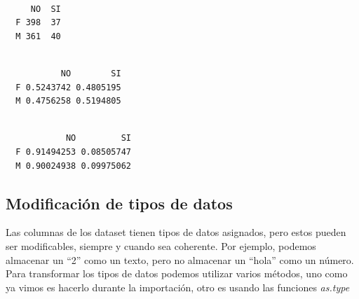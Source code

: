 \documentclass[
  letterpaper,
  DIV=11,
  numbers=noendperiod]{scrreprt}
\newenvironment{Shaded}{\begin{snugshade}}{\end{snugshade}}
\newcommand{\AttributeTok}[1]{\textcolor[rgb]{0.40,0.45,0.13}{#1}}
\newcommand{\DecValTok}[1]{\textcolor[rgb]{0.68,0.00,0.00}{#1}}
\newcommand{\FunctionTok}[1]{\textcolor[rgb]{0.28,0.35,0.67}{#1}}
\newcommand{\NormalTok}[1]{\textcolor[rgb]{0.00,0.23,0.31}{#1}}
\newcommand{\SpecialCharTok}[1]{\textcolor[rgb]{0.37,0.37,0.37}{#1}}
\begin{document}
\begin{verbatim}
   
     NO  SI
  F 398  37
  M 361  40
\end{verbatim}

\begin{Shaded}
\end{Shaded}

\begin{verbatim}
   
           NO        SI
  F 0.5243742 0.4805195
  M 0.4756258 0.5194805
\end{verbatim}

\begin{Shaded}
\end{Shaded}

\begin{verbatim}
   
            NO         SI
  F 0.91494253 0.08505747
  M 0.90024938 0.09975062
\end{verbatim}

\hypertarget{modificaciuxf3n-de-tipos-de-datos}{%
\subsection{Modificación de tipos de
datos}\label{modificaciuxf3n-de-tipos-de-datos}}

Las columnas de los dataset tienen tipos de datos asignados, pero estos
pueden ser modificables, siempre y cuando sea coherente. Por ejemplo,
podemos almacenar un ``2'' como un texto, pero no almacenar un ``hola''
como un número. Para transformar los tipos de datos podemos utilizar
varios métodos, uno como ya vimos es hacerlo durante la importación,
otro es usando las funciones \emph{as.type}
\end{document}
